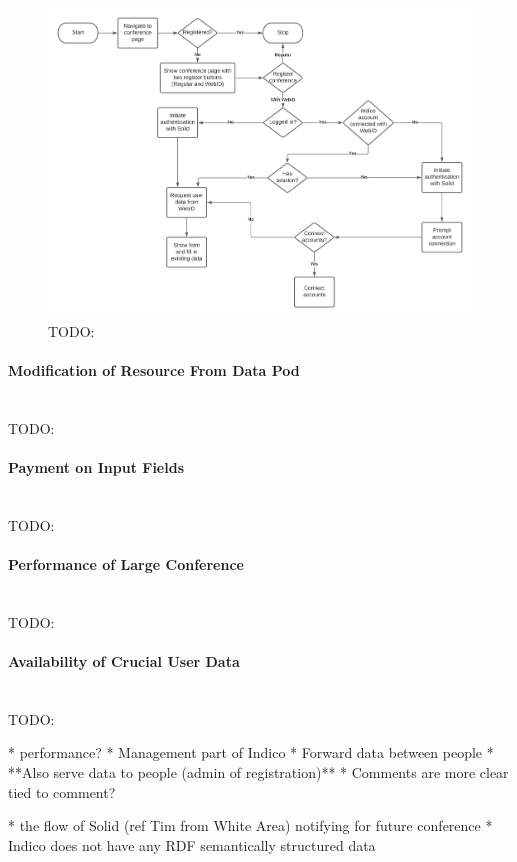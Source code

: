 \begin{figure}
    \centering
    \includegraphics[width=1\textwidth]{prototype/graphs/poc-conference_registration_flow-sideways.jpeg}
    \caption{TODO:}
    \label{fig:poc-conference_registration_flow-sideways}
\end{figure}
\vspace{0.5cm}
\paragraph{Modification of Resource From Data Pod}\mbox{}\\

TODO:
\vspace{0.5cm}
\paragraph{Payment on Input Fields}\mbox{}\\

TODO:
\vspace{0.5cm}
\paragraph{Performance of Large Conference}\mbox{}\\

TODO:
\vspace{0.5cm}
\paragraph{Availability of Crucial User Data}\mbox{}\\

TODO:


* performance?
* Management part of Indico
  * Forward data between people
  * **Also serve data to people (admin of registration)**
* Comments are more clear tied to comment?

* the flow of Solid (ref Tim from White Area) notifying for future conference
* Indico does not have any RDF semantically structured data